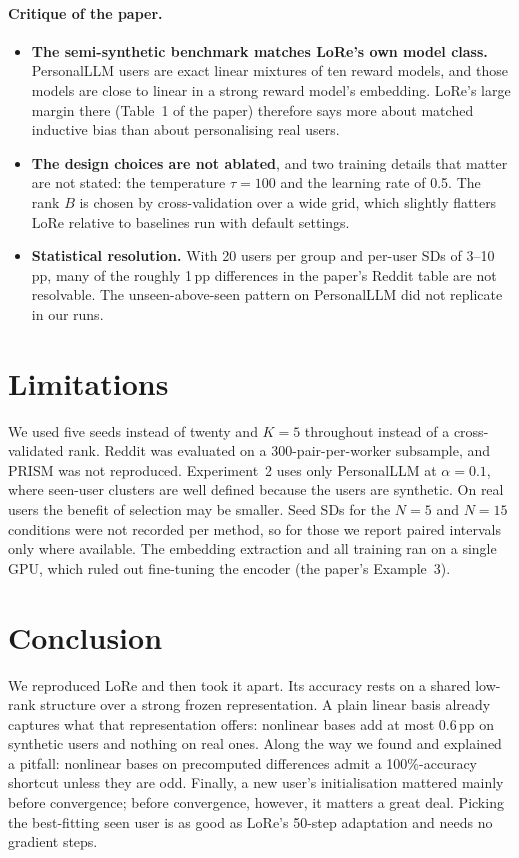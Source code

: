 \documentclass[11pt,a4paper]{article}
\newcommand{\pp}{\,pp\xspace}
\begin{document}
\paragraph{Critique of the paper.}
\begin{itemize}
\item \textbf{The semi-synthetic benchmark matches LoRe's own model class.} PersonalLLM users are exact
linear mixtures of ten reward models, and those models are close to linear in a strong reward model's
embedding. LoRe's large margin there (Table~1 of the paper) therefore says more about matched
inductive bias than about personalising real users.
\item \textbf{The design choices are not ablated}, and two training details that matter are not stated:
the temperature $\tau=100$ and the learning rate of 0.5. The rank $B$ is chosen by cross-validation
over a wide grid, which slightly flatters LoRe relative to baselines run with default settings.
\item \textbf{Statistical resolution.} With 20 users per group and per-user SDs of 3--10\pp, many of the
roughly 1\pp differences in the paper's Reddit table are not resolvable. The unseen-above-seen pattern
on PersonalLLM did not replicate in our runs.
\end{itemize}

\section{Limitations}
We used five seeds instead of twenty and $K=5$ throughout instead of a cross-validated rank. Reddit
was evaluated on a 300-pair-per-worker subsample, and PRISM was not reproduced. Experiment~2 uses only
PersonalLLM at $\alpha=0.1$, where seen-user clusters are well defined because the users are synthetic.
On real users the benefit of selection may be smaller. Seed SDs for the $N=5$ and $N=15$ conditions were
not recorded per method, so for those we report paired intervals only where available. The embedding
extraction and all training ran on a single GPU, which ruled out fine-tuning the encoder (the paper's
Example~3).

\section{Conclusion}
We reproduced LoRe and then took it apart. Its accuracy rests on a shared low-rank structure over a
strong frozen representation. A plain linear basis already captures what that representation offers:
nonlinear bases add at most 0.6\pp on synthetic users and nothing on real ones. Along the way we found
and explained a pitfall: nonlinear bases on precomputed differences admit a 100\%-accuracy shortcut
unless they are odd. Finally, a new user's initialisation mattered mainly before convergence; before convergence, however, it matters a great deal. Picking the
best-fitting seen user is as good as LoRe's 50-step adaptation and needs no gradient steps.
\end{document}
